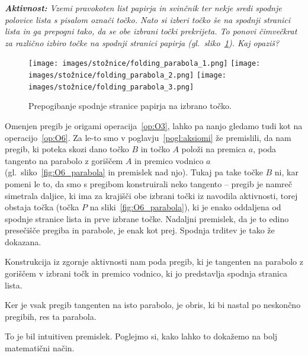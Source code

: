 \textit{\textbf{Aktivnost:} Vzemi pravokoten list papirja in svinčnik ter nekje sredi spodnje polovice lista s pisalom označi točko. Nato si izberi točko še na spodnji stranici lista in ga prepogni tako, da se obe izbrani točki prekrijeta. To ponovi čimvečkrat za različno izbiro točke na spodnji stranici papirja (gl.\ sliko~\ref{fig:koraki_parabola}). Kaj opaziš?}

\begin{figure}[h]
    \centering
    \texttt{[image: images/stožnice/folding\_parabola\_1.png]}
    \texttt{[image: images/stožnice/folding\_parabola\_2.png]}
    \texttt{[image: images/stožnice/folding\_parabola\_3.png]}
    \caption[Prepogibanje parabole]{Prepogibanje spodnje stranice papirja na izbrano točko.}
    \label{fig:koraki_parabola}
\end{figure}


Omenjen pregib je origami operacija~\ref{op:O3}, lahko pa nanjo gledamo tudi kot na operacijo~\ref{op:O6}. Za le-to smo v poglavju~\ref{pogl:aksiomi} že premislili, da nam pregib, ki poteka skozi dano točko $B$ in točko $A$ položi na premica $a$, poda tangento na parabolo z goriščem $A$ in premico vodnico $a$ (gl.\ sliko~\ref{fig:O6_parabola} in premislek nad njo). Tukaj pa take točke $B$ ni, kar pomeni le to, da smo s pregibom konstruirali neko tangento -- pregib je namreč simetrala daljice, ki ima za krajišči obe izbrani točki iz navodila aktivnosti, torej obstaja točka (točka $P$ na sliki~\ref{fig:O6_parabola}), ki je enako oddaljena od spodnje stranice lista in prve izbrane točke. Nadaljni premislek, da je to edino presečišče pregiba in parabole, je enak kot prej. Spodnja trditev je tako že dokazana.

\begin{trditev}
    Konstrukcija iz zgornje aktivnosti nam poda pregib, ki je tangenten na parabolo z goriščem v izbrani točk in premico vodnico, ki jo predstavlja spodnja stranica lista.
\end{trditev}

Ker je vsak pregib tangenten na isto parabolo, je obris, ki bi nastal po neskončno pregibih, res ta parabola.

To je bil intuitiven premislek. Poglejmo si, kako lahko to dokažemo na bolj matematični način.

